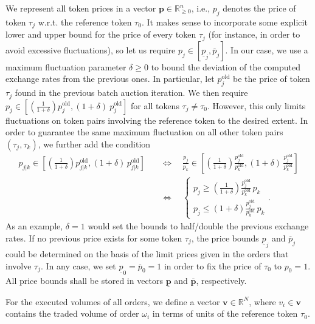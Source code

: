 \documentclass[11pt,parskip=full]{scrartcl}%
\newcommand*{\ie}{i.e., }
\newcommand*{\wrt}{w.r.t. }
\begin{document}
We represent all token prices in a vector $ \mathbf{p} \in \mathbb{R}^n_{\ge 0} $, \ie $ p_j $
denotes the price of token $ \tau_j $ \wrt the reference token $ \tau_0 $.
It makes sense to incorporate some explicit lower and upper bound for the price of every token $
\tau_j $ (for instance, in order to avoid excessive fluctuations), so let us require
$ p_j \in [\underline{p}_j,\overline{p}_j] $.
In our case, we use a maximum fluctuation parameter $ \delta \ge 0 $ to bound the deviation of the
computed exchange rates from the previous ones.
In particular, let $ p^\mathrm{old}_j $ be the price of token $ \tau_j $ found in the previous
batch auction iteration.
We then require $ p_j \in [(\frac{1}{1+\delta}) p^\mathrm{old}_j, (1+\delta) \> p^\mathrm{old}_j] $
for all tokens $ \tau_j \neq \tau_0 $.
However, this only limits fluctuations on token pairs involving the reference token to the desired
extent.
In order to guarantee the same maximum fluctuation on all other token pairs $ (\tau_j,\tau_k) $,
we further add the condition
\begin{align*}
  p_{j|k} \in
  \left[
    \left(\frac{1}{1+\delta}\right) p^\mathrm{old}_{j|k},
    (1+\delta) \, p^\mathrm{old}_{j|k}
  \right]
  \quad &\Leftrightarrow \quad
  \frac{p_j}{p_k} \in
  \left[
    \left(\frac{1}{1+\delta}\right) \frac{p^\mathrm{old}_j}{p^\mathrm{old}_k},
    (1+\delta) \, \frac{p^\mathrm{old}_j}{p^\mathrm{old}_k}
  \right]\\[2mm]
  \quad &\Leftrightarrow \quad
  \begin{cases}
    p_j \ge \left(\frac{1}{1+\delta}\right) \frac{p^\mathrm{old}_j}{p^\mathrm{old}_k} \, p_k
    \\[2mm]
    p_j \le \left(1+\delta\right) \frac{p^\mathrm{old}_j}{p^\mathrm{old}_k} \, p_k
  \end{cases}.
\end{align*}
As an example, $ \delta = 1 $ would set the bounds to half/double the previous exchange rates.
If no previous price exists for some token $ \tau_j $, the price bounds $ \underline{p}_j $
and $ \overline{p}_j $ could be determined on the basis of the limit prices given in the orders
that involve $ \tau_j $.
In any case, we set $ \underline{p}_0 = \overline{p}_0 = 1 $ in order to fix the price of
$ \tau_0 $ to $ p_0 = 1 $.
All price bounds shall be stored in vectors $ \underline{\mathbf{p}} $ and $ \overline{\mathbf{p}}
$, respectively.

For the executed volumes of all orders, we define a vector $ \mathbf{v} \in \mathbb{R}^N $, where
$ v_i \in \mathbf{v} $ contains the traded volume of order $ \omega_i $ in terms of units of the
reference token $ \tau_0 $.
\end{document}
